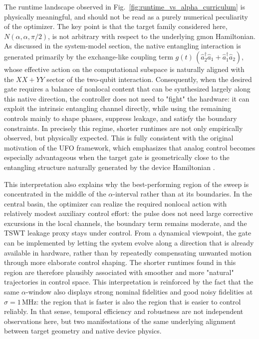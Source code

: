 The runtime landscape observed in Fig.~\ref{fig:runtime_vs_alpha_curriculum} is physically meaningful, and should not be read as a purely numerical peculiarity of the optimizer. The key point is that the target family considered here,
\(N(\alpha,\alpha,\pi/2)\), is not arbitrary with respect to the underlying gmon Hamiltonian. As discussed in the system-model section, the native entangling interaction is generated primarily by the exchange-like coupling term
\(g(t)\,(\hat a_2^\dagger \hat a_1+\hat a_1^\dagger \hat a_2)\), whose effective action on the computational subspace is naturally aligned with the
\(XX+YY\) sector of the two-qubit interaction. Consequently, when the desired gate requires a balance of nonlocal content that can be synthesized largely along this native direction, the controller does not need to "fight" the hardware: it can exploit the intrinsic entangling channel directly, while using the remaining controls mainly to shape phases, suppress leakage, and satisfy the boundary constraints. In precisely this regime, shorter runtimes are not only empirically observed, but physically expected. This is fully consistent with the original motivation of the UFO framework, which emphasizes that analog control becomes especially advantageous when the target gate is geometrically close to the entangling structure naturally generated by the device Hamiltonian \cite{Niu2019}.

This interpretation also explains why the best-performing region of the sweep is concentrated in the middle of the
\(\alpha\)-interval rather than at its boundaries. In the central basin, the optimizer can realize the required nonlocal action with relatively modest auxiliary control effort: the pulse does not need large corrective excursions in the local channels, the boundary term remains moderate, and the TSWT leakage proxy stays under control. From a dynamical viewpoint, the gate can be implemented by letting the system evolve along a direction that is already available in hardware, rather than by repeatedly compensating unwanted motion through more elaborate control shaping. The shorter runtimes found in this region are therefore plausibly associated with smoother and more "natural" trajectories in control space. This interpretation is reinforced by the fact that the same \(\alpha\)-window also displays strong nominal fidelities and good noisy fidelities at \(\sigma=1\,\mathrm{MHz}\): the region that is faster is also the region that is easier to control reliably. In that sense, temporal efficiency and robustness are not independent observations here, but two manifestations of the same underlying alignment between target geometry and native device physics.

